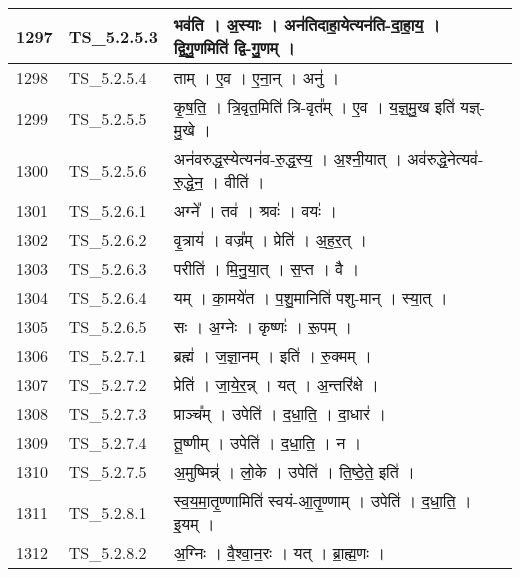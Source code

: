 \documentclass[17pt]{extarticle}
\begin{document}
\begin{longtable}{||p{0.4in}||p{0.9in}||p{4.0in}||p{0.9in}||}
        \hline
            1297 & TS\_5.2.5.3 & भव॑ति   ।   अ॒स्याः   ।   अन॑तिदाहा॒येत्यन॑ति{-}दा॒हा॒य॒   ।   द्वि॒गु॒णमिति॑ द्वि{-}गु॒णम्   ।    &      \\
        \hline
            1298 & TS\_5.2.5.4 & ताम्   ।   ए॒व   ।   ए॒ना॒न्   ।   अनु॑   ।    &      \\
        \hline
            1299 & TS\_5.2.5.5 & कृ॒ष॒ति॒   ।   त्रि॒वृत॒मिति॑ त्रि{-}वृत᳚म्   ।   ए॒व   ।   य॒ज्ञ्॒मु॒ख इति॑ यज्ञ्{-}मु॒खे   ।    &      \\
        \hline
            1300 & TS\_5.2.5.6 & अन॑वरुद्ध॒स्येत्यन॑व{-}रु॒द्ध॒स्य॒   ।   अ॒श्नी॒यात्   ।   अव॑रुद्धे॒नेत्यव॑{-}रु॒द्धे॒न॒   ।   वीति॑   ।    &      \\
        \hline
            1301 & TS\_5.2.6.1 & अग्ने᳚   ।   तव॑   ।   श्रवः॑   ।   वयः॑   ।    &      \\
        \hline
            1302 & TS\_5.2.6.2 & वृ॒त्राय॑   ।   वज्र᳚म्   ।   प्रेति॑   ।   अ॒ह॒र॒त्   ।    &      \\
        \hline
            1303 & TS\_5.2.6.3 & परीति॑   ।   मि॒नु॒या॒त्   ।   स॒प्त   ।   वै   ।    &      \\
        \hline
            1304 & TS\_5.2.6.4 & यम्   ।   का॒मये॑त   ।   प॒शु॒मानिति॑ पशु{-}मान्   ।   स्या॒त्   ।    &      \\
        \hline
            1305 & TS\_5.2.6.5 & सः   ।   अ॒ग्नेः   ।   कृष्णः॑   ।   रू॒पम्   ।    &      \\
        \hline
            1306 & TS\_5.2.7.1 & ब्रह्म॑   ।   ज॒ज्ञा॒नम्   ।   इति॑   ।   रु॒क्मम्   ।    &      \\
        \hline
            1307 & TS\_5.2.7.2 & प्रेति॑   ।   जा॒ये॒र॒न्न्   ।   यत्   ।   अ॒न्तरि॑क्षे   ।    &      \\
        \hline
            1308 & TS\_5.2.7.3 & प्राञ्च᳚म्   ।   उपेति॑   ।   द॒धा॒ति॒   ।   दा॒धार॑   ।    &      \\
        \hline
            1309 & TS\_5.2.7.4 & तू॒ष्णीम्   ।   उपेति॑   ।   द॒धा॒ति॒   ।   न   ।    &      \\
        \hline
            1310 & TS\_5.2.7.5 & अ॒मुष्मिन्न्॑   ।   लो॒के   ।   उपेति॑   ।   ति॒ष्ठे॒ते॒ इति॑   ।    &      \\
        \hline
            1311 & TS\_5.2.8.1 & स्व॒य॒मा॒तृ॒ण्णामिति॑ स्वयं{-}आ॒तृ॒ण्णाम्   ।   उपेति॑   ।   द॒धा॒ति॒   ।   इ॒यम्   ।    &      \\
        \hline
            1312 & TS\_5.2.8.2 & अ॒ग्निः   ।   वै॒श्वा॒न॒रः   ।   यत्   ।   ब्रा॒ह्म॒णः   ।    &      \\

\end{longtable}
\end{document}
